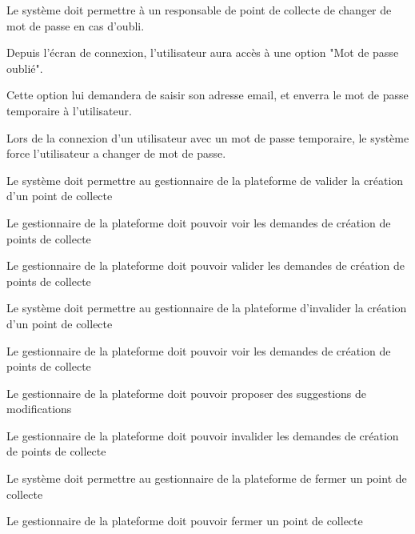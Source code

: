 \begin{reqf}{Le système doit permettre à un responsable de point de collecte de changer de mot de passe en cas d'oubli.}
\item Depuis l'écran de connexion, l'utilisateur aura accès à une option "Mot de passe oublié".
\item Cette option lui demandera de saisir son adresse email, et enverra le mot de passe temporaire à l'utilisateur.
\item Lors de la connexion d'un utilisateur avec un mot de passe temporaire, le système force l'utilisateur a changer de mot de passe.
\end{reqf}






\begin{reqf}{Le système doit permettre au gestionnaire de la plateforme de valider la création d'un point de collecte}
\item Le gestionnaire de la plateforme doit pouvoir voir les demandes de création de points de collecte
\item Le gestionnaire de la plateforme doit pouvoir valider les demandes de création de points de collecte
\end{reqf}

\begin{reqf}{Le système doit permettre au gestionnaire de la plateforme d'invalider la création d'un point de collecte}
\item Le gestionnaire de la plateforme doit pouvoir voir les demandes de création de points de collecte
\item Le gestionnaire de la plateforme doit pouvoir proposer des suggestions de modifications
\item Le gestionnaire de la plateforme doit pouvoir invalider les demandes de création de points de collecte
\end{reqf}

\begin{reqf}{Le système doit permettre au gestionnaire de la plateforme de fermer un point de collecte}
\item Le gestionnaire de la plateforme doit pouvoir fermer un point de collecte
\end{reqf}

